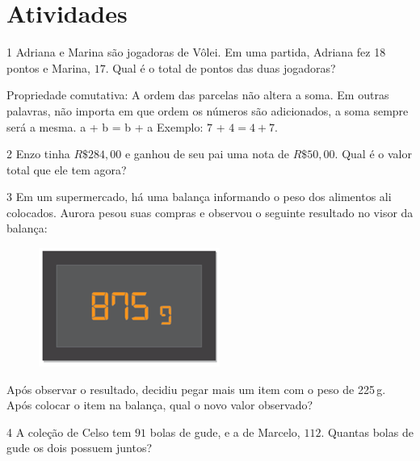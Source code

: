 \section{Atividades}

\num{1} Adriana e Marina são jogadoras de Vôlei. Em uma partida, Adriana fez
18 pontos e Marina, $17$. Qual é o total de pontos das duas jogadoras?



\noindent Propriedade comutativa: A ordem das parcelas não
altera a soma. Em outras palavras, não importa em que ordem os números
são adicionados, a soma sempre será a mesma. a + b = b + a Exemplo: $7$ +
$4 = 4 + 7$.

\num{2}  Enzo tinha $R\$284,00$ e ganhou de seu pai uma nota de $R\$50,00$. Qual é
o valor total que ele tem agora?


\num{3}  Em um supermercado, há uma balança informando o peso dos alimentos
ali colocados. Aurora pesou suas compras e observou o seguinte resultado
no visor da balança:

\begin{figure}
\centering\includegraphics[width=2.33333in,height=1.53125in]{./imgSAEB_6_MAT/media/image23.png}
\end{figure}

Após observar o resultado, decidiu pegar mais um item com o peso de
225\,g. Após colocar o item na balança, qual o novo valor observado?


\num{4}  A coleção de Celso tem $91$ bolas de gude, e a de Marcelo, $112$. Quantas
bolas de gude os dois possuem juntos?



